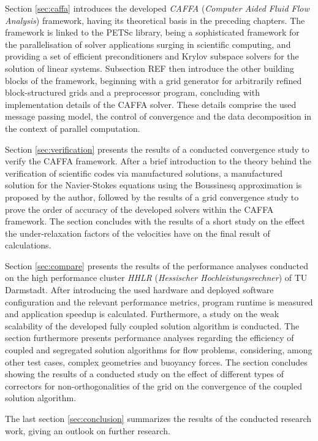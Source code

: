 Section \ref{sec:caffa} introduces the developed \emph{CAFFA} (\emph{Computer Aided Fluid Flow Analysis}) framework, having its theoretical basis in the preceding chapters. The framework is linked to the PETSc library, being a sophisticated framework for the parallelisation of solver applications surging in scientific computing, and providing a set of efficient preconditioners and Krylov subspace solvers for the solution of linear systems. Subsection REF then introduce the other building blocks of the framework, beginning with a grid generator for arbitrarily refined block-structured grids and a preprocessor program, concluding with implementation details of the CAFFA solver. These details comprise the used message passing model, the control of convergence and the data decomposition in the context of parallel computation.

Section \ref{sec:verification} presents the results of a conducted convergence study to verify the CAFFA framework. After a brief introduction to the theory behind the verification of scientific codes via manufactured solutions, a manufactured solution for the Navier-Stokes equations using the Boussinesq approximation is proposed by the author, followed by the results of a grid convergence study to prove the order of accuracy of the developed solvers within the CAFFA framework. The section concludes with the results of a short study on the effect the under-relaxation factors of the velocities have on the final result of calculations.

Section \ref{sec:compare} presents the results of the performance analyses conducted on the high performance cluster \emph{HHLR} (\emph{Hessischer Hochleistungsrechner}) of TU Darmstadt. After introducing the used hardware and deployed software configuration and the relevant performance metrics, program runtime is measured and application speedup is calculated. Furthermore, a study on the weak scalability of the developed fully coupled solution algorithm is conducted. The section furthermore presents performance analyses regarding the efficiency of coupled and segregated solution algorithms for flow problems, considering, among other test cases, complex geometries and buoyancy forces. The section concludes showing the results of a conducted study on the effect of different types of correctors for non-orthogonalities of the grid on the convergence of the coupled solution algorithm.

The last section \ref{sec:conclusion} summarizes the results of the conducted research work, giving an outlook on further research.

